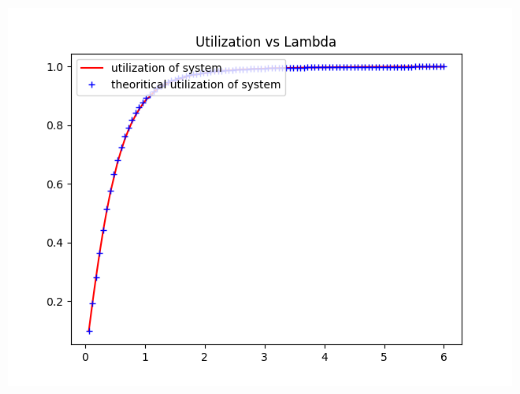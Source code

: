 \documentclass[11pt]{article}
\begin{document}
 \includegraphics{Utilization_L10_K4_M2_U3}
 
\end{document}
